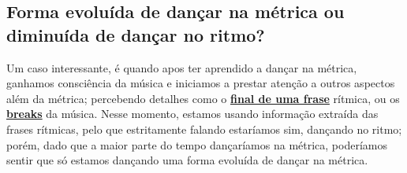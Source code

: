 \subsection{Forma evoluída de dançar na métrica ou diminuída de dançar no ritmo?}
Um caso interessante, é quando apos ter aprendido a dançar na métrica,
ganhamos consciência da música e iniciamos a prestar atenção a outros aspectos além da métrica;
percebendo detalhes como o \hyperref[sec:perceberfrases]{\textbf{final de uma frase}} rítmica, 
ou os \hyperref[sec:percepcionbreak]{\textbf{breaks}} da  música.
Nesse momento, estamos usando informação extraída das frases rítmicas, 
pelo que estritamente falando estaríamos sim,  dançando no ritmo; 
porém, dado que a maior parte do tempo dançaríamos na métrica,
 poderíamos sentir que só estamos dançando uma forma evoluída de dançar na métrica.

